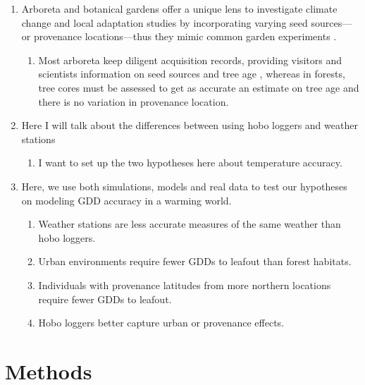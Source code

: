\documentclass{article}\usepackage[]{graphicx}\usepackage[]{color}
\begin{document}
\begin{enumerate}
\item Arboreta and botanical gardens offer a unique lens to investigate climate change and local adaptation studies by incorporating varying seed sources---or provenance locations---thus they mimic common garden experiments \citep{Primack2009}. 
  \begin{enumerate}
  \item Most arboreta keep diligent acquisition records, providing visitors and scientists information on seed sources and tree age \citep{Dosmann2006}, whereas in forests, tree cores must be assessed to get as accurate an estimate on tree age and there is no variation in provenance location.
  \end{enumerate}
  
\item Here I will talk about the differences between using hobo loggers and weather stations
  \begin{enumerate}
  \item I want to set up the two hypotheses here about temperature accuracy.
  \end{enumerate}
  
\item Here, we use both simulations, models and real data to test our hypotheses on modeling GDD accuracy in a warming world.
  \begin{enumerate}
  \item Weather stations are less accurate measures of the same weather than hobo loggers.
  \item Urban environments require fewer GDDs to leafout than forest habitats.
  \item Individuals with provenance latitudes from more northern locations require fewer GDDs to leafout. 
  \item Hobo loggers better capture urban or provenance effects. 
  \end{enumerate}
\end{enumerate}
  

\section*{Methods}
\end{document}
